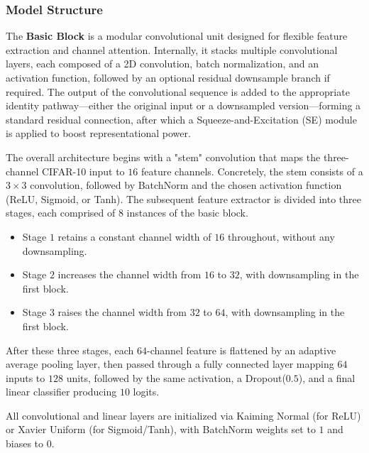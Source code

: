 \documentclass{article}
\begin{document}
\subsubsection{Model Structure}

The \textbf{Basic Block} is a modular convolutional unit designed for flexible feature extraction and channel attention. Internally, it stacks multiple convolutional layers, each composed of a 2D convolution, batch normalization, and an activation function, followed by an optional residual downsample branch if required. The output of the convolutional sequence is added to the appropriate identity pathway—either the original input or a downsampled version—forming a standard residual connection, after which a Squeeze-and-Excitation (SE) module is applied to boost representational power.

The overall architecture begins with a "stem" convolution that maps the three-channel CIFAR-10 input to $16$ feature channels. Concretely, the stem consists of a $3\times 3$ convolution, followed by BatchNorm and the chosen activation function (ReLU, Sigmoid, or Tanh). The subsequent feature extractor is divided into three stages, each comprised of $8$ instances of the basic block.

\begin{itemize}
    \item Stage $1$ retains a constant channel width of $16$ throughout, without any downsampling.

    \item Stage $2$ increases the channel width from $16$ to $32$, with downsampling in the first block.

    \item Stage $3$ raises the channel width from $32$ to $64$, with downsampling in the first block.
\end{itemize}

After these three stages, each $64$-channel feature is flattened by an adaptive average pooling layer, then passed through a fully connected layer mapping $64$ inputs to $128$ units, followed by the same activation, a Dropout($0.5$), and a final linear classifier producing $10$ logits. 

All convolutional and linear layers are initialized via Kaiming Normal (for ReLU) or Xavier Uniform (for Sigmoid/Tanh), with BatchNorm weights set to $1$ and biases to $0$.

\end{document}
